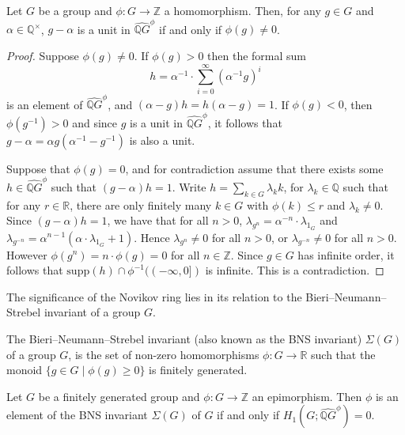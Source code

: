 \begin{lemma}\label{units}
Let $G$ be a group and $\phi \colon G \to \mathbb{Z}$ a homomorphism. Then, for any $g\in G$ and $\alpha \in \mathbb{Q}^{\times}$, $g- \alpha$ is a unit in $\widehat{\mathbb{Q}G}^{\phi}$ if and only if $\phi(g)\neq 0$.
\end{lemma}

\begin{proof}

Suppose $\phi(g) \neq 0$. If $\phi(g) > 0$ then the formal sum \[h = \alpha^{-1}\cdot\sum_{i = 0}^{\infty} (\alpha^{-1}g)^i\] is an element of $\widehat{\mathbb{Q}G}^{\phi}$, and $(\alpha - g)h = h(\alpha -g) = 1$. If $\phi(g) < 0$, then $\phi(g^{-1}) > 0$ and since $g$ is a unit in $\widehat{\mathbb{Q}G}^{\phi}$, it follows that $g-\alpha = \alpha g (\alpha^{-1}-g^{-1})$ is also a unit.

Suppose that $\phi(g) = 0$, and for contradiction assume that there exists some $h \in \widehat{\mathbb{Q}G}^{\phi}$ such that $(g-\alpha)h = 1$. Write $h = \sum_{k\in G} \lambda_k k$, for $\lambda_k \in \mathbb{Q}$ such that for any $r \in \mathbb{R}$, there are only finitely many $k \in G$ with $\phi(k) \leq r$ and $\lambda_k \neq 0$. Since $(g-\alpha)h = 1$, we have that for all $n > 0$, $\lambda_{g^n} = \alpha^{-n} \cdot \lambda_{1_G}$ and $\lambda_{g^{-n}} = \alpha^{n-1}(\alpha\cdot \lambda_{1_G} + 1)$. Hence $\lambda_{g^n} \neq 0$ for all $n > 0$, or $\lambda_{g^{-n}} \neq 0$ for all $n > 0$. However $\phi(g^{n}) = n \cdot \phi(g) = 0$ for all $n \in \mathbb{Z}$. Since $g \in G$ has infinite order, it follows that $\mathrm{supp}(h) \cap \phi^{-1}((-\infty, 0 ])$ is infinite. This is a contradiction.\end{proof}

The significance of the Novikov ring lies in its relation to the Bieri--Neumann--Strebel invariant of a group $G$. 

\begin{defn}\cite{BNS}
The Bieri--Neumann--Strebel invariant (also known as the BNS invariant)  $\Sigma(G)$ of a group $G$, is the set of non-zero homomorphisms $\phi\colon G \to \mathbb{R}$ such that the monoid $\{g\in G \mid \phi(g) \geq 0\}$ is finitely generated.
\end{defn}

\begin{thm}[Sikorav]\cite{Sikorav, Kielak}\label{Sikorav}
Let $G$ be a finitely generated group and $\phi \colon G \to \mathbb{Z}$ an epimorphism. Then $\phi$ is an element of the BNS invariant $\Sigma(G)$ of $G$ if and only if $H_1(G; \widehat{\mathbb{Q}G}^{\phi}) = 0$.
\end{thm}

